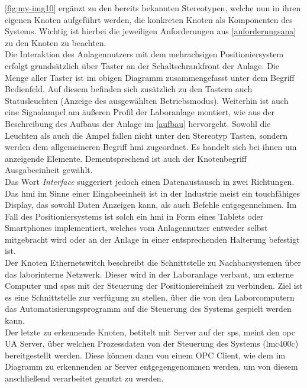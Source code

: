 \documentclass[../../../Bachelorarbeit.tex]{subfiles}
\begin{document}
\autoref{fig:my-img10} ergänzt zu den bereits bekannten Stereotypen, welche nun in ihren eigenen Knoten aufgeführt werden, die konkreten Knoten als Komponenten des Systems. Wichtig ist hierbei die jeweiligen Anforderungen aus \autoref{anforderungsana} zu den Knoten zu beachten.\\
Die Interaktion des Anlagennutzers mit dem mehrachsigen Positioniersystem erfolgt grundsätzlich über Taster an der Schaltschrankfront der Anlage. Die Menge aller Taster ist im obigen Diagramm zusammengefasst unter dem Begriff Bedienfeld. Auf diesem befinden sich zusätzlich zu den Tastern auch Statusleuchten (Anzeige des ausgewählten Betriebsmodus). Weiterhin ist auch eine Signalampel am äußeren Profil der Laboranlage montiert, wie aus der Beschreibung des Aufbaus der Anlage im \autoref{aufbau} hervorgeht. Sowohl die Leuchten als auch die Ampel fallen nicht unter den Stereotyp Tasten, sondern werden dem allgemeineren Begriff \acf{hmi} zugeordnet. Es handelt sich bei ihnen um anzeigende Elemente. Dementsprechend ist auch der Knotenbegriff Ausgabeeinheit gewählt. \\
Das Wort \textit{Interface} suggeriert jedoch einen Datenaustausch in zwei Richtungen. Das \ac{hmi} im Sinne einer Eingabeeinheit ist in der Industrie meist ein touchfähiges Display, das sowohl Daten Anzeigen kann, als auch Befehle entgegennehmen. Im Fall des Positioniersystems ist solch ein \ac{hmi} in Form eines Tablets oder Smartphones implementiert, welches vom Anlagennutzer entweder selbst mitgebracht wird oder an der Anlage in einer entsprechenden Halterung befestigt ist.\\
Der Knoten Ethernetswitch beschreibt die Schnittstelle zu Nachbarsystemen über das laborinterne Netzwerk. Dieser wird in der Laboranlage verbaut, um externe Computer und \acsp{sps} mit der Steuerung der Positioniereinheit zu verbinden. Ziel ist es eine Schnittstelle zur verfügung zu stellen, über die von den Laborcomputern das Automatisierungsprogramm auf die Steuerung des Systems gespielt werden kann. \\
Der letzte zu erkennende Knoten, betitelt mit Server auf der \ac{sps}, meint den \ac{opc} UA Server, über welchen Prozessdaten von der Steuerung des Systems (\acs{lmc}400c) bereitgestellt werden. Diese können dann von einem OPC Client, wie \zB dem im Diagramm zu erkennenden \ac{ar} Server entgegengenommen werden, um von diesem anschließend verarbeitet \bzw genutzt zu werden.
\end{document}
